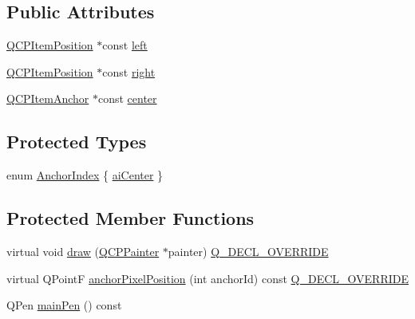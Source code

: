 \subsection*{Public Attributes}
\begin{DoxyCompactItemize}
\item 
\mbox{\hyperlink{class_q_c_p_item_position}{Q\+C\+P\+Item\+Position}} $\ast$const \mbox{\hyperlink{class_q_c_p_item_bracket_af6cc6d27d96171778c6927d6edce48b0}{left}}
\item 
\mbox{\hyperlink{class_q_c_p_item_position}{Q\+C\+P\+Item\+Position}} $\ast$const \mbox{\hyperlink{class_q_c_p_item_bracket_afa6c1360b05a50c4e0df37b3cebab6be}{right}}
\item 
\mbox{\hyperlink{class_q_c_p_item_anchor}{Q\+C\+P\+Item\+Anchor}} $\ast$const \mbox{\hyperlink{class_q_c_p_item_bracket_a2dbcabdf5f467f28be12a7b25962ffca}{center}}
\end{DoxyCompactItemize}
\subsection*{Protected Types}
\begin{DoxyCompactItemize}
\item 
enum \mbox{\hyperlink{class_q_c_p_item_bracket_a7f3a6a56d67f71219ed220553f3dd861}{Anchor\+Index}} \{ \mbox{\hyperlink{class_q_c_p_item_bracket_a7f3a6a56d67f71219ed220553f3dd861a17b57ef34cc05eadfe9becd1ad5b5242}{ai\+Center}}
 \}
\end{DoxyCompactItemize}
\subsection*{Protected Member Functions}
\begin{DoxyCompactItemize}
\item 
virtual void \mbox{\hyperlink{class_q_c_p_item_bracket_a942a3978aea44a2fc7b4383f2bf6d417}{draw}} (\mbox{\hyperlink{class_q_c_p_painter}{Q\+C\+P\+Painter}} $\ast$painter) \mbox{\hyperlink{qcustomplot_8h_a42cc5eaeb25b85f8b52d2a4b94c56f55}{Q\+\_\+\+D\+E\+C\+L\+\_\+\+O\+V\+E\+R\+R\+I\+DE}}
\item 
virtual Q\+PointF \mbox{\hyperlink{class_q_c_p_item_bracket_a008d87325d26b6616d368cec06027cce}{anchor\+Pixel\+Position}} (int anchor\+Id) const \mbox{\hyperlink{qcustomplot_8h_a42cc5eaeb25b85f8b52d2a4b94c56f55}{Q\+\_\+\+D\+E\+C\+L\+\_\+\+O\+V\+E\+R\+R\+I\+DE}}
\item 
Q\+Pen \mbox{\hyperlink{class_q_c_p_item_bracket_af1c445df1a574bddc8a40efcd76dd2e1}{main\+Pen}} () const
\end{DoxyCompactItemize}
